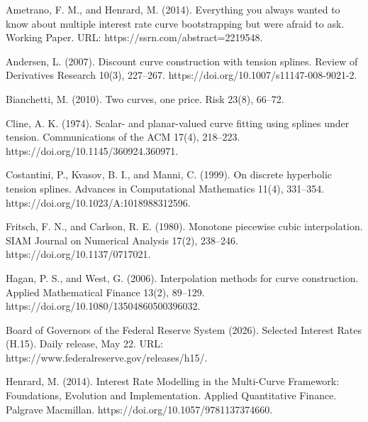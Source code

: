 
\begin{thebibliography}{}

 Ametrano, F. M., and Henrard, M. (2014). Everything you always
wanted to know about multiple interest rate curve bootstrapping but were afraid to ask.
Working Paper. URL: https://ssrn.com/abstract=2219548.

 Andersen, L. (2007). Discount curve construction with tension
splines. Review of Derivatives Research 10(3), 227--267.
https://doi.org/10.1007/s11147-008-9021-2.

 Bianchetti, M. (2010). Two curves, one price. Risk 23(8), 66--72.

 Cline, A. K. (1974). Scalar- and planar-valued curve fitting using
splines under tension. Communications of the ACM 17(4), 218--223.
https://doi.org/10.1145/360924.360971.

 Costantini, P., Kvasov, B. I., and Manni, C. (1999). On discrete
hyperbolic tension splines. Advances in Computational Mathematics 11(4), 331--354.
https://doi.org/10.1023/A:1018988312596.

 Fritsch, F. N., and Carlson, R. E. (1980). Monotone piecewise cubic
interpolation. SIAM Journal on Numerical Analysis 17(2), 238--246.
https://doi.org/10.1137/0717021.

 Hagan, P. S., and West, G. (2006). Interpolation methods for curve
construction. Applied Mathematical Finance 13(2), 89--129.
https://doi.org/10.1080/13504860500396032.

 Board of Governors of the Federal Reserve System (2026). Selected
Interest Rates (H.15). Daily release, May 22.
URL: https://www.federalreserve.gov/releases/h15/.

 Henrard, M. (2014). Interest Rate Modelling in the Multi-Curve
Framework: Foundations, Evolution and Implementation. Applied Quantitative Finance.
Palgrave Macmillan. https://doi.org/10.1057/9781137374660.


\end{thebibliography}
